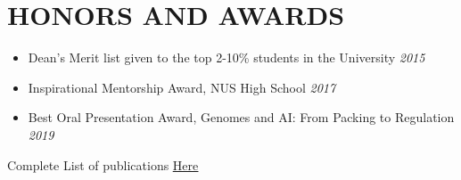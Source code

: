\documentclass[letterpaper,11pt]{article}
\begin{document}
\section{\bf HONORS AND AWARDS}
\begin{itemize}
    \item Dean’s Merit list given to the top 2-10\% students in the University \hfill \emph {2015}
    \item Inspirational Mentorship Award, NUS High School \hfill \emph {2017} 
    \item Best Oral Presentation Award, Genomes and AI: From Packing to Regulation \hfill \emph{2019} 
\end{itemize}

\vspace{2mm}

Complete List of publications {\href{https://tinyurl.com/pulications-sv}{\underline {Here}}}
\end{document}
